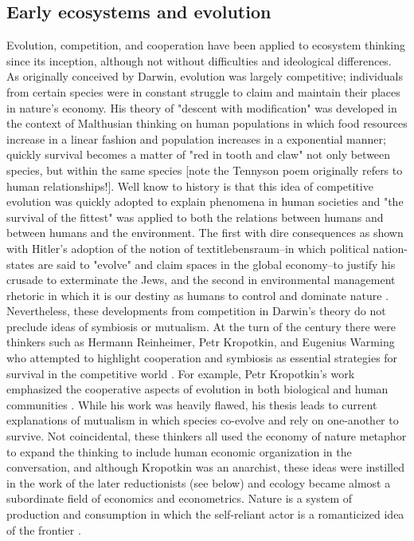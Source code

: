 \subsection{Early ecosystems and evolution}
Evolution, competition, and cooperation have been applied to ecosystem thinking since its inception, although not without difficulties and ideological differences. As originally conceived by Darwin, evolution was largely competitive; individuals from certain species were in constant struggle to claim and maintain their places in nature's economy. His theory of "descent with modification" was developed in the context of Malthusian thinking on human populations in which food resources increase in a linear fashion and population increases in a exponential manner; quickly survival becomes a matter of "red in tooth and claw" not only between species, but within the same species \cite{stoddart_1966,tennyson_1849} [note the Tennyson poem originally refers to human relationships!]. Well know to history is that this idea of competitive evolution was quickly adopted to explain phenomena in human societies and "the survival of the fittest" was applied to both the relations between humans and between humans and the environment. The first with dire consequences as shown with Hitler's adoption of the notion of textit{lebensraum}--in which political nation-states are said to "evolve" and claim spaces in the global economy--to justify his crusade to exterminate the Jews, and the second in environmental management rhetoric in which it is our destiny as humans to control and dominate nature \cite{stoddart_1966,worster_1977}. Nevertheless, these developments from competition in Darwin's theory do not preclude ideas of symbiosis or mutualism. At the turn of the century there were thinkers such as Hermann Reinheimer, Petr Kropotkin, and Eugenius Warming who attempted to highlight cooperation and symbiosis as essential strategies for survival in the competitive world \cite{worster_1977}. For example, Petr Kropotkin's work emphasized the cooperative aspects of evolution in both biological and human communities \cite{kropotkin_1902}. While his work was heavily flawed, his thesis leads to current explanations of mutualism in which species co-evolve and rely on one-another to survive. Not coincidental, these thinkers all used the economy of nature metaphor to expand the thinking to include human economic organization in the conversation, and although Kropotkin was an anarchist, these ideas were instilled in the work of the later reductionists (see below) and ecology became almost a subordinate field of economics and econometrics. Nature is a system of production and consumption in which the self-reliant actor is a romanticized idea of the frontier \cite{worster_1977}.


